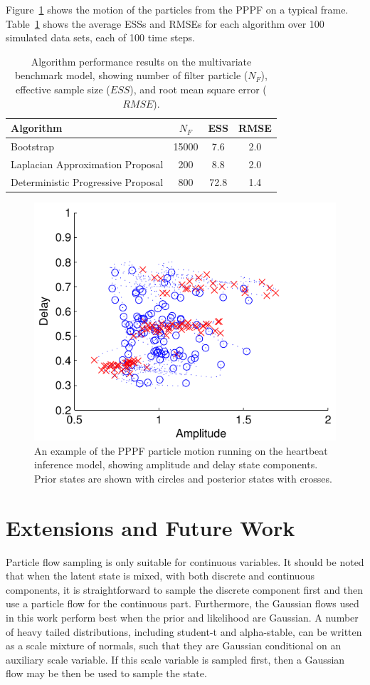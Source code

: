 \documentclass{article}
\begin{document}
Figure~\ref{fig:sineha_example_frame} shows the motion of the particles from the PPPF on a typical frame. Table~\ref{tab:sineha_results} shows the average ESSs and RMSEs for each algorithm over 100 simulated data sets, each of 100 time steps.
%
\begin{table}
\centering
\begin{tabular}{l||c|c|c}
Algorithm                                & $N_F$ & ESS  & RMSE \\
\hline
Bootstrap                                & 15000 &  7.6 &  2.0 \\
Laplacian Approximation Proposal         &   200 &  8.8 &  2.0 \\
Deterministic Progressive Proposal       &   800 & 72.8 &  1.4 \\
\end{tabular}
\caption{Algorithm performance results on the multivariate benchmark model, showing number of filter particle ($N_F$), effective sample size ($ESS$), and root mean square error ($RMSE$).}
\label{tab:sineha_results}
\end{table}
%
\begin{figure}
\centering
\includegraphics[width=0.7\columnwidth]{sineha_example_frame.pdf}
\caption{An example of the PPPF particle motion running on the heartbeat inference model, showing amplitude and delay state components. Prior states are shown with circles and posterior states with crosses.}
\label{fig:sineha_example_frame}
\end{figure}



\section{Extensions and Future Work}

Particle flow sampling is only suitable for continuous variables. It should be noted that when the latent state is mixed, with both discrete and continuous components, it is straightforward to sample the discrete component first and then use a particle flow for the continuous part. Furthermore, the Gaussian flows used in this work perform best when the prior and likelihood are Gaussian. A number of heavy tailed distributions, including student-t and alpha-stable, can be written as a scale mixture of normals, such that they are Gaussian conditional on an auxiliary scale variable. If this scale variable is sampled first, then a Gaussian flow may be then be used to sample the state.
\end{document}
